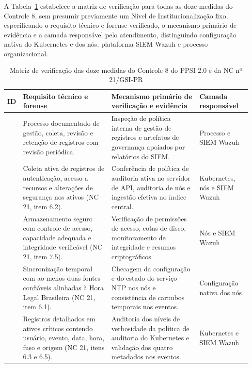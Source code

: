A Tabela~\ref{tab:ec_matriz_controle8} estabelece a matriz de verificação para todas as doze medidas do Controle 8, sem presumir previamente um Nível de Institucionalização fixo, especificando o requisito técnico e forense verificado, o mecanismo primário de evidência e a camada responsável pelo atendimento, distinguindo configuração nativa do Kubernetes e dos nós, plataforma SIEM Wazuh e processo organizacional.

\begin{table}[htbp]
    \centering
    \caption{Matriz de verificação das doze medidas do Controle 8 do PPSI 2.0 e da NC nº 21/GSI-PR}
    \label{tab:ec_matriz_controle8}
    \footnotesize
    \begin{tabular}{>{\centering\arraybackslash}p{0.7cm}>{\raggedright\arraybackslash}p{5.2cm}>{\raggedright\arraybackslash}p{5.2cm}>{\raggedright\arraybackslash}p{2.4cm}}
        \hline
        \textbf{ID} & \textbf{Requisito técnico e forense} & \textbf{Mecanismo primário de verificação e evidência} & \textbf{Camada responsável} \\ \hline
        8.1 & Processo documentado de gestão, coleta, revisão e retenção de registros com revisão periódica. & Inspeção de política interna de gestão de registros e artefatos de governança apoiados por relatórios do SIEM. & Processo e SIEM Wazuh \\ \hline
        8.2 & Coleta ativa de registros de autenticação, acesso a recursos e alterações de segurança nos ativos (NC 21, item 6.2). & Conferência de política de auditoria ativa no servidor de API, auditoria de nós e ingestão efetiva no índice central. & Kubernetes, nós e SIEM Wazuh \\ \hline
        8.3 & Armazenamento seguro com controle de acesso, capacidade adequada e integridade verificável (NC 21, item 7.5). & Verificação de permissões de acesso, cotas de disco, monitoramento de integridade e resumos criptográficos. & Nós e SIEM Wazuh \\ \hline
        8.4 & Sincronização temporal com ao menos duas fontes confiáveis alinhadas à Hora Legal Brasileira (NC 21, item 6.1). & Checagem da configuração e do estado do serviço NTP nos nós e consistência de carimbos temporais nos eventos. & Configuração nativa dos nós \\ \hline
        8.5 & Registros detalhados em ativos críticos contendo usuário, evento, data, hora, fuso e origem (NC 21, itens 6.3 e 6.5). & Auditoria dos níveis de verbosidade da política de auditoria do Kubernetes e validação dos quatro metadados nos eventos. & Kubernetes e SIEM Wazuh \\ \hline

\end{tabular}
\end{table}
